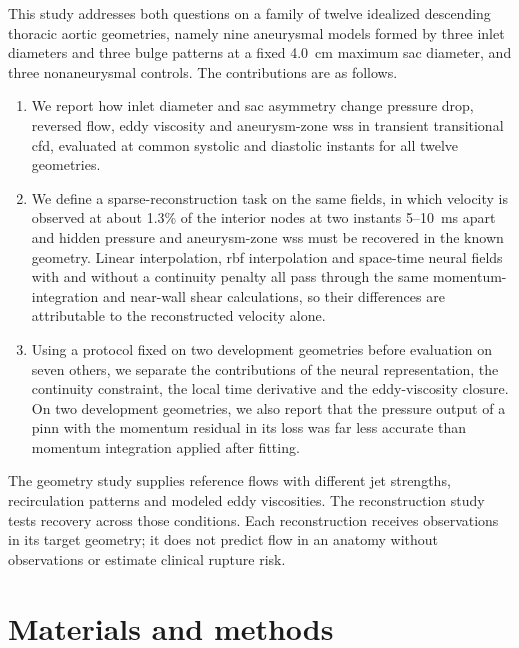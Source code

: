 \documentclass[12pt,a4paper]{article}
\newcommand{\CFD}{\ac{cfd}\xspace}
\newcommand{\PINN}{\ac{pinn}\xspace}
\newcommand{\WSS}{\ac{wss}\xspace}
\newcommand{\RBF}{\ac{rbf}\xspace}
\theoremstyle{definition}
\numberwithin{equation}{section}
\begin{document}
This study addresses both questions on a family of twelve idealized descending thoracic aortic geometries, namely nine aneurysmal models formed by three inlet diameters and three bulge patterns at a fixed 4.0~cm maximum sac diameter, and three nonaneurysmal controls. The contributions are as follows.
\begin{enumerate}
\item We report how inlet diameter and sac asymmetry change pressure drop, reversed flow, eddy viscosity and aneurysm-zone \WSS in transient transitional \CFD, evaluated at common systolic and diastolic instants for all twelve geometries.
\item We define a sparse-reconstruction task on the same fields, in which velocity is observed at about 1.3\% of the interior nodes at two instants 5--10~ms apart and hidden pressure and aneurysm-zone \WSS must be recovered in the known geometry. Linear interpolation, \RBF interpolation and space-time neural fields with and without a continuity penalty all pass through the same momentum-integration and near-wall shear calculations, so their differences are attributable to the reconstructed velocity alone.
\item Using a protocol fixed on two development geometries before evaluation on seven others, we separate the contributions of the neural representation, the continuity constraint, the local time derivative and the eddy-viscosity closure. On two development geometries, we also report that the pressure output of a \PINN with the momentum residual in its loss was far less accurate than momentum integration applied after fitting.
\end{enumerate}
The geometry study supplies reference flows with different jet strengths, recirculation patterns and modeled eddy viscosities. The reconstruction study tests recovery across those conditions. Each reconstruction receives observations in its target geometry; it does not predict flow in an anatomy without observations or estimate clinical rupture risk.


\section{\label{Material and Methods}Materials and methods}
\end{document}
